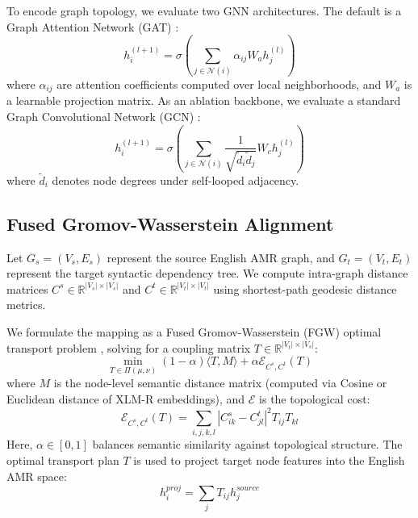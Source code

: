 \documentclass[11pt,a4paper,twocolumn]{article}
\begin{document}
To encode graph topology, we evaluate two GNN architectures. The default is a Graph Attention Network (GAT) \cite{velickovic2018graph}:
\begin{equation}
h_i^{(l+1)} = \sigma \left( \sum_{j \in \mathcal{N}(i)} \alpha_{ij} W_a h_j^{(l)} \right)
\end{equation}
where $\alpha_{ij}$ are attention coefficients computed over local neighborhoods, and $W_a$ is a learnable projection matrix. As an ablation backbone, we evaluate a standard Graph Convolutional Network (GCN) \cite{kipf2016semi}:
\begin{equation}
h_i^{(l+1)} = \sigma \left( \sum_{j \in \mathcal{N}(i)} \frac{1}{\sqrt{\tilde{d}_i \tilde{d}_j}} W_c h_j^{(l)} \right)
\end{equation}
where $\tilde{d}_i$ denotes node degrees under self-looped adjacency.

\subsection{Fused Gromov-Wasserstein Alignment}
Let $G_s = (V_s, E_s)$ represent the source English AMR graph, and $G_t = (V_t, E_t)$ represent the target syntactic dependency tree. We compute intra-graph distance matrices $C^s \in \mathbb{R}^{|V_s| \times |V_s|}$ and $C^t \in \mathbb{R}^{|V_t| \times |V_t|}$ using shortest-path geodesic distance metrics.

We formulate the mapping as a Fused Gromov-Wasserstein (FGW) optimal transport problem \cite{titouan2019sliced}, solving for a coupling matrix $T \in \mathbb{R}^{|V_t| \times |V_s|}$:
\begin{equation}
\min_{T \in \Pi(\mu, \nu)} (1-\alpha) \langle T, M \rangle + \alpha \mathcal{E}_{C^s, C^t}(T)
\end{equation}
where $M$ is the node-level semantic distance matrix (computed via Cosine or Euclidean distance of XLM-R embeddings), and $\mathcal{E}$ is the topological cost:
\begin{equation}
\mathcal{E}_{C^s, C^t}(T) = \sum_{i,j,k,l} |C^s_{ik} - C^t_{jl}|^2 T_{ij} T_{kl}
\end{equation}
Here, $\alpha \in [0, 1]$ balances semantic similarity against topological structure. The optimal transport plan $T$ is used to project target node features into the English AMR space:
\begin{equation}
h_i^{proj} = \sum_{j} T_{ij} h_j^{source}
\end{equation}
\end{document}
